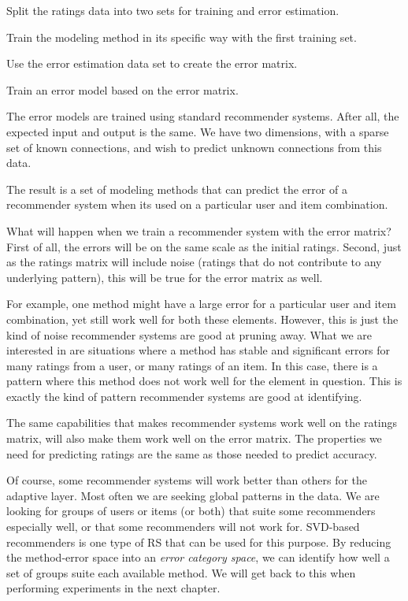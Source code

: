\begin{enumerate*}
  \item Split the ratings data into two sets for training and error estimation.
  \item Train the modeling method in its specific way with the first training set.
  \item Use the error estimation data set to create the error matrix.
  \item Train an error model based on the error matrix.
\end{enumerate*}

The error models are trained using standard recommender systems.
After all, the expected input and output is the same.
We have two dimensions, with a sparse set of known connections,
and wish to predict unknown connections from this data.

The result is a set of modeling methods
that can predict the error of a recommender system
when its used on a particular user and item combination.

What will happen when we train a recommender system with the error matrix?
First of all, the errors will be on the same scale as the initial ratings.
Second, just as the ratings matrix will include noise (ratings that
do not contribute to any underlying pattern), this will be 
true for the error matrix as well.

For example, one method might have a large error for a particular user and item combination,
yet still work well for both these elements. 
However, this is just the kind of noise recommender systems are good at pruning away.
What we are interested in are situations where a method
has stable and significant errors for many ratings from a user,
or many ratings of an item.
In this case, there is a pattern where this method does not 
work well for the element in question.
This is exactly the kind of pattern recommender systems are good at identifying.

The same capabilities that makes recommender systems work well
on the ratings matrix, will also make them work well on the error matrix.
The properties we need for predicting ratings
are the same as those needed to predict accuracy.

Of course, some recommender systems will work better than others for the adaptive layer.
Most often we are seeking global patterns in the data.
We are looking for groups of users or items (or both) that suite some 
recommenders especially well, or that some recommenders will not work for.
SVD-based recommenders is one type of RS that can be used for this purpose.
By reducing the method-error space into an \emph{error category space},
we can identify how well a set of groups suite each available method.
We will get back to this when performing experiments in the next chapter.

